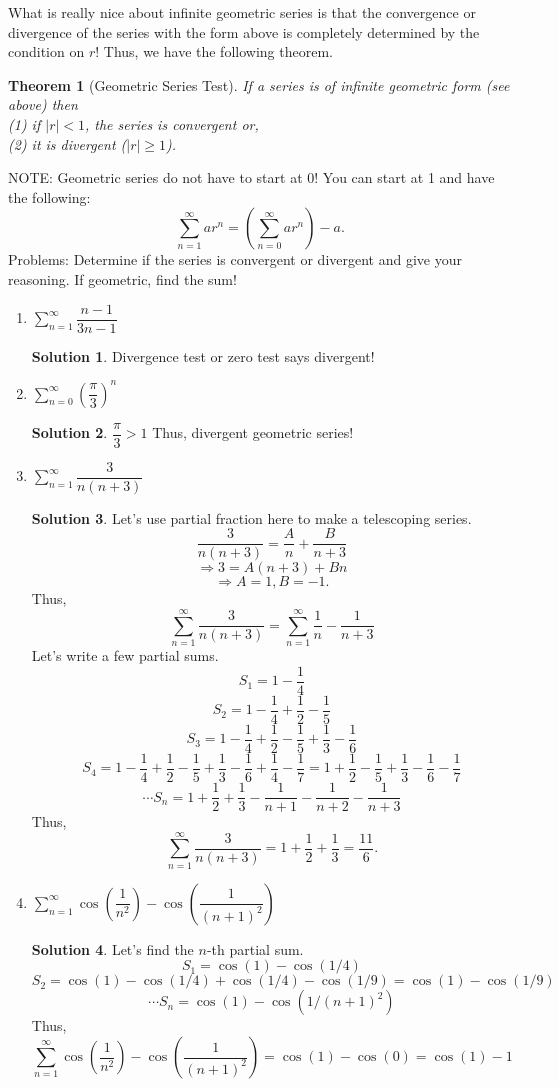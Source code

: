 \documentclass[10pt]{article}
\newcommand{\ds}{\displaystyle}
\theoremstyle{Theorem}
\newtheorem{theorem}{Theorem}[section]
\theoremstyle{definition}
\newtheorem*{solution}{Solution}
\theoremstyle{remark}
\theoremstyle{custom}
\begin{document}
What is really nice about infinite geometric series is that the convergence or divergence of the series with the form above is completely determined by the condition on $r$! Thus, we have the following theorem.
\begin{theorem}[Geometric Series Test]
If a series is of infinite geometric form (see above) then\\
(1) if $|r|<1$, the series is convergent or,\\
(2) it is divergent ($|r|\geq 1$).
\end{theorem}
NOTE: Geometric series do not have to start at 0! You can start at 1 and have the following:
\[
\sum_{n=1}^{\infty}ar^n=\left(\sum_{n=0}^{\infty}ar^n\right)-a.
\]
\newpage
\noindent Problems: Determine if the series is convergent or divergent and give your reasoning. If geometric, find the sum!
\begin{enumerate}[1.]
\item $\ds \sum_{n=1}^{\infty} \dfrac{n-1}{3n-1}$
\begin{solution}
Divergence test or zero test says divergent!
\end{solution}
\item $\ds \sum_{n=0}^{\infty} \left(\dfrac{\pi}{3}\right)^n$
\begin{solution}
$\dfrac{\pi}{3}>1$ Thus, divergent geometric series!
\end{solution}
\item $\ds \sum_{n=1}^{\infty} \dfrac{3}{n(n+3)}$
\begin{solution}
Let's use partial fraction here to make a telescoping series.
\[
\dfrac{3}{n(n+3)}= \dfrac{A}{n}+\dfrac{B}{n+3}
\]
\[
\Rightarrow 3=A(n+3)+Bn
\]
\[
\Rightarrow A=1, B=-1.
\]
Thus, 
\[
\ds \sum_{n=1}^{\infty} \dfrac{3}{n(n+3)}=\ds \sum_{n=1}^{\infty} \dfrac{1}{n}-\dfrac{1}{n+3}
\]
Let's write a few partial sums.
\[
S_1=1-\dfrac{1}{4}
\]
\[
S_2=1-\dfrac{1}{4}+\dfrac{1}{2}-\dfrac{1}{5}
\]
\[
S_3=1-\dfrac{1}{4}+\dfrac{1}{2}-\dfrac{1}{5}+\dfrac{1}{3}-\dfrac{1}{6}
\]
\[
S_4=1-\dfrac{1}{4}+\dfrac{1}{2}-\dfrac{1}{5}+\dfrac{1}{3}-\dfrac{1}{6}+\dfrac{1}{4}-\dfrac{1}{7}=1+\dfrac{1}{2}-\dfrac{1}{5}+\dfrac{1}{3}-\dfrac{1}{6}-\dfrac{1}{7}
\]
\[
\cdots S_n=1+\dfrac{1}{2}+\dfrac{1}{3}-\dfrac{1}{n+1}-\dfrac{1}{n+2}-\dfrac{1}{n+3}
\]
Thus, 
\[
\ds \sum_{n=1}^{\infty} \dfrac{3}{n(n+3)}=1+\dfrac{1}{2}+\dfrac{1}{3}=\dfrac{11}{6}.
\]
\end{solution}
\newpage
\item $\ds \sum_{n=1}^{\infty}  \cos\left(\dfrac{1}{n^2}\right)-\cos\left(\dfrac{1}{(n+1)^2}\right)$
\begin{solution}
Let's find the $n$-th partial sum.
\[
S_1=\cos(1)-\cos(1/4)
\]
\[
S_2=\cos(1)-\cos(1/4)+\cos(1/4)-\cos(1/9)=\cos(1)-\cos(1/9)
\]
\[
\cdots S_n=\cos(1)-\cos(1/(n+1)^2)
\]
Thus, 
\[
\ds \sum_{n=1}^{\infty}  \cos\left(\dfrac{1}{n^2}\right)-\cos\left(\dfrac{1}{(n+1)^2}\right)=\cos(1)-\cos(0)=\cos(1)-1
\]


\end{solution}
\end{enumerate}
\end{document}
